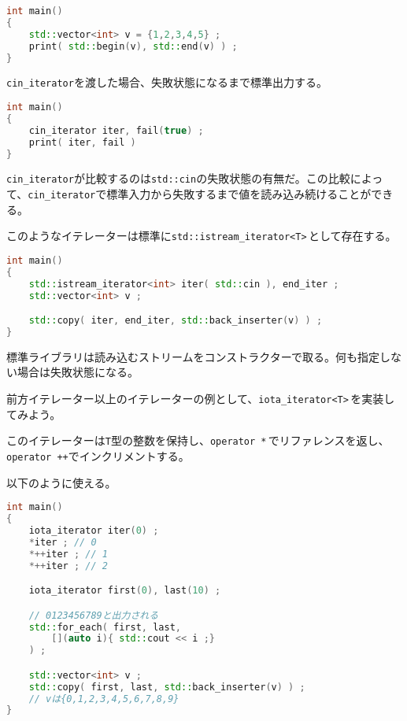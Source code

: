 \begin{lstlisting}[language={C++}]
int main()
{
    std::vector<int> v = {1,2,3,4,5} ;
    print( std::begin(v), std::end(v) ) ;
}
\end{lstlisting}

\texttt{cin\_iterator}を渡した場合、失敗状態になるまで標準出力する。

\begin{lstlisting}[language={C++}]
int main()
{
    cin_iterator iter, fail(true) ;
    print( iter, fail )
}
\end{lstlisting}

\texttt{cin\_iterator}が比較するのは\texttt{std::cin}の失敗状態の有無だ。この比較によって、\texttt{cin\_iterator}で標準入力から失敗するまで値を読み込み続けることができる。

このようなイテレーターは標準に\texttt{std::istream\_iterator<T>}\,として存在する。

\ifTombow\pagebreak\fi
\begin{lstlisting}[language={C++}]
int main()
{
    std::istream_iterator<int> iter( std::cin ), end_iter ;
    std::vector<int> v ;

    std::copy( iter, end_iter, std::back_inserter(v) ) ;
}
\end{lstlisting}

標準ライブラリは読み込むストリームをコンストラクターで取る。何も指定しない場合は失敗状態になる。


前方イテレーター以上のイテレーターの例として、\texttt{iota\_iterator<T>}\,を実装してみよう。

このイテレーターは\texttt{T}型の整数を保持し、\texttt{operator *}\,でリファレンスを返し、\texttt{operator ++}でインクリメントする。

以下のように使える。

\begin{lstlisting}[language={C++}]
int main()
{
    iota_iterator iter(0) ;
    *iter ; // 0
    *++iter ; // 1
    *++iter ; // 2

    iota_iterator first(0), last(10) ;

    // 0123456789と出力される
    std::for_each( first, last,
        [](auto i){ std::cout << i ;}
    ) ;

    std::vector<int> v ;
    std::copy( first, last, std::back_inserter(v) ) ;
    // vは{0,1,2,3,4,5,6,7,8,9}
}
\end{lstlisting}

